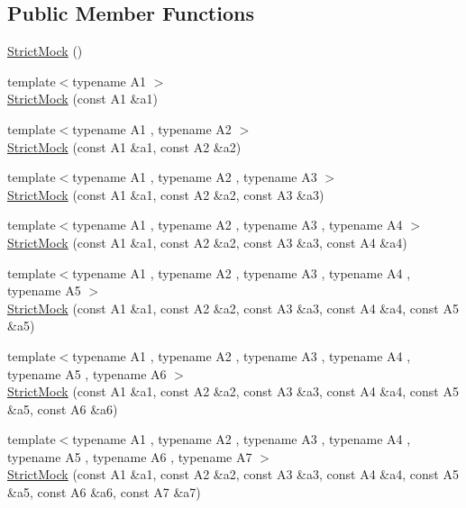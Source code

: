 \subsection*{Public Member Functions}
\begin{DoxyCompactItemize}
\item 
\hyperlink{classtesting_1_1_strict_mock_ad609d745db75306dd3b360b5410923fe}{Strict\+Mock} ()
\item 
{\footnotesize template$<$typename A1 $>$ }\\\hyperlink{classtesting_1_1_strict_mock_a42db27ba0af29804db8589676817aff8}{Strict\+Mock} (const A1 \&a1)
\item 
{\footnotesize template$<$typename A1 , typename A2 $>$ }\\\hyperlink{classtesting_1_1_strict_mock_a345933f3f1a10de381a508f93e680c6b}{Strict\+Mock} (const A1 \&a1, const A2 \&a2)
\item 
{\footnotesize template$<$typename A1 , typename A2 , typename A3 $>$ }\\\hyperlink{classtesting_1_1_strict_mock_acc25729cd85a3a412106863894a30fe7}{Strict\+Mock} (const A1 \&a1, const A2 \&a2, const A3 \&a3)
\item 
{\footnotesize template$<$typename A1 , typename A2 , typename A3 , typename A4 $>$ }\\\hyperlink{classtesting_1_1_strict_mock_a6b42ef1460901ea91a2a09f44ae8fba2}{Strict\+Mock} (const A1 \&a1, const A2 \&a2, const A3 \&a3, const A4 \&a4)
\item 
{\footnotesize template$<$typename A1 , typename A2 , typename A3 , typename A4 , typename A5 $>$ }\\\hyperlink{classtesting_1_1_strict_mock_a2019f4e86224b2adbb9e9326bc175c50}{Strict\+Mock} (const A1 \&a1, const A2 \&a2, const A3 \&a3, const A4 \&a4, const A5 \&a5)
\item 
{\footnotesize template$<$typename A1 , typename A2 , typename A3 , typename A4 , typename A5 , typename A6 $>$ }\\\hyperlink{classtesting_1_1_strict_mock_a17b452e1e2f57d7d10f7209587376eef}{Strict\+Mock} (const A1 \&a1, const A2 \&a2, const A3 \&a3, const A4 \&a4, const A5 \&a5, const A6 \&a6)
\item 
{\footnotesize template$<$typename A1 , typename A2 , typename A3 , typename A4 , typename A5 , typename A6 , typename A7 $>$ }\\\hyperlink{classtesting_1_1_strict_mock_a4af48752fc22815250369292b9c064bc}{Strict\+Mock} (const A1 \&a1, const A2 \&a2, const A3 \&a3, const A4 \&a4, const A5 \&a5, const A6 \&a6, const A7 \&a7)

\end{DoxyCompactItemize}
